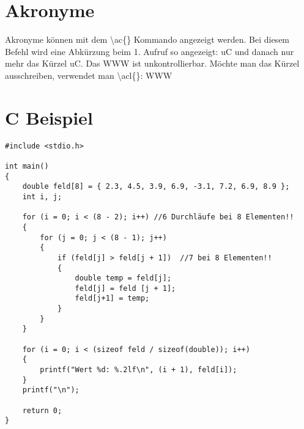 \begin{table}[H]
\caption{Tabellenbeispiel}
\label{Tabellenbeispiel}
\end{table}

\section{Akronyme}
\label{sec:akronyme}
Akronyme können mit dem \textbackslash{}ac\{\} Kommando angezeigt werden. Bei diesem Befehl wird eine Abkürzung beim 1. Aufruf so angezeigt: \ac{uC} und danach nur mehr das Kürzel \ac{uC}. Das \ac{WWW} ist unkontrollierbar. Möchte man das Kürzel ausschreiben, verwendet man \textbackslash{}acl\{\}: \acl{WWW}

\section{C Beispiel}
\label{sec:c-beispiel}

\begin{lstlisting}[style=C,caption=C Codebeispiel]
#include <stdio.h>

int main()
{
    double feld[8] = { 2.3, 4.5, 3.9, 6.9, -3.1, 7.2, 6.9, 8.9 };
    int i, j;
    
    for (i = 0; i < (8 - 2); i++) //6 Durchläufe bei 8 Elementen!!
    {  
        for (j = 0; j < (8 - 1); j++)
        {
            if (feld[j] > feld[j + 1])  //7 bei 8 Elementen!!
            {
                double temp = feld[j];
                feld[j] = feld [j + 1];
                feld[j+1] = temp;
            }
        }
    }
    
    for (i = 0; i < (sizeof feld / sizeof(double)); i++)
    {
        printf("Wert %d: %.2lf\n", (i + 1), feld[i]);
    }
    printf("\n");
    
    return 0;
}

\end{lstlisting}
\newpage